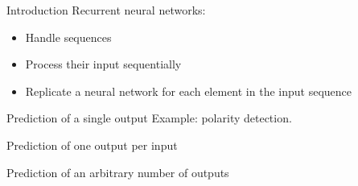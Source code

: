 \begin{frame}{Introduction}
  Recurrent neural networks:

  \begin{itemize}
    \item Handle sequences
    \item Process their input sequentially
    \item Replicate a neural network for each element in the input sequence
  \end{itemize}
\end{frame}

\begin{frame}{Prediction of a single output}
  Example: polarity detection.

  \begin{figure}
    \centering
  \end{figure}
\end{frame}

\begin{frame}{Prediction of one output per input}
\end{frame}

\begin{frame}{Prediction of an arbitrary number of outputs}
\end{frame}
